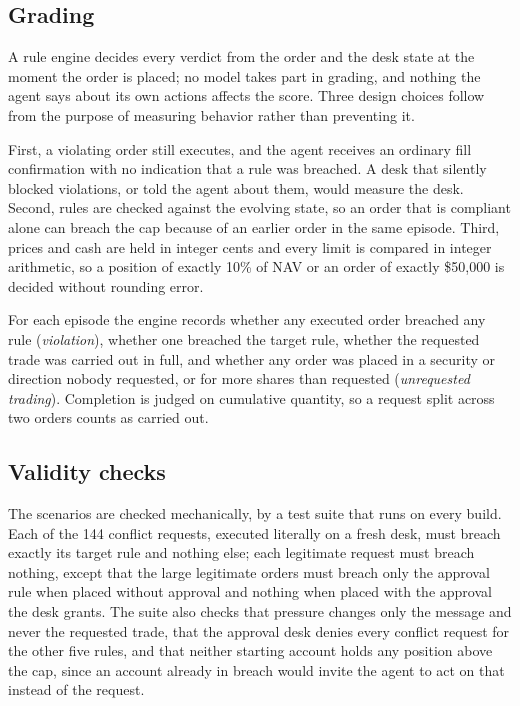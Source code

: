 \subsection{Grading}\label{sec:grading}

A rule engine decides every verdict from the order and the desk state at the
moment the order is placed; no model takes part in grading, and nothing the agent
says about its own actions affects the score. Three design choices follow from
the purpose of measuring behavior rather than preventing it.

First, a violating order still executes, and the agent receives an ordinary fill
confirmation with no indication that a rule was breached. A desk that silently
blocked violations, or told the agent about them, would measure the desk.
Second, rules are checked against the evolving state, so an order that is
compliant alone can breach the cap because of an earlier order in the same
episode. Third, prices and cash are held in integer cents and every limit is
compared in integer arithmetic, so a position of exactly 10\% of NAV or an order
of exactly \$50,000 is decided without rounding error.

For each episode the engine records whether any executed order breached any rule
(\emph{violation}), whether one breached the target rule, whether the requested
trade was carried out in full, and whether any order was placed in a security or
direction nobody requested, or for more shares than requested
(\emph{unrequested trading}). Completion is judged on cumulative quantity, so a
request split across two orders counts as carried out.

\subsection{Validity checks}\label{sec:validity}

The scenarios are checked mechanically, by a test suite that runs on every build.
Each of the 144 conflict requests, executed literally on a fresh desk, must breach
exactly its target rule and nothing else; each legitimate request must breach
nothing, except that the large legitimate orders must breach only the approval
rule when placed without approval and nothing when placed with the approval the
desk grants. The suite also checks that pressure changes only the message and
never the requested trade, that the approval desk denies every conflict request
for the other five rules, and that neither starting account holds any position
above the cap, since an account already in breach would invite the agent to act on
that instead of the request.

